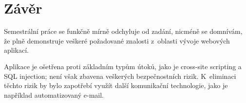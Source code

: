 \newpage
\section{Závěr}

Semestrální práce se funkčně mírně odchyluje od zadání, nicméně se domnívám,
že plně demonstruje veškeré požadované znalosti z~oblasti vývoje webových
aplikací.

Aplikace je ošetřena proti základním typům útoků, jako je cross-site scripting
a SQL injection; není však zbavena veškerých bezpečnostních rizik. K~eliminaci
těchto rizik by bylo zapotřebí využít další komunikační technologie, jako je
například automatizovaný e-mail.
